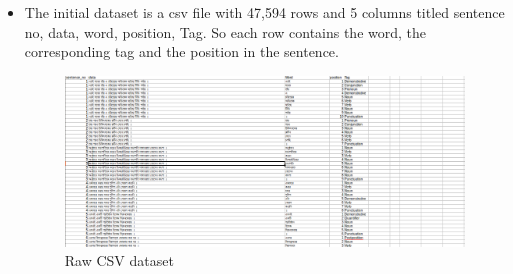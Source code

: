 \documentclass{standalone}
\begin{document}
\begin{itemize}
    \item The initial dataset is a csv file with 47,594 rows and 5 columns titled sentence no, data, word, position, Tag. So each row contains the word, the corresponding tag and the position in the sentence.
    \begin{figure}[H]
    \centering
    \includegraphics[width=1.0\columnwidth]{img/csvImage.png}
    \caption{Raw CSV dataset}
    \label{csv1}
    \end{figure}
\end{itemize}
\end{document}
